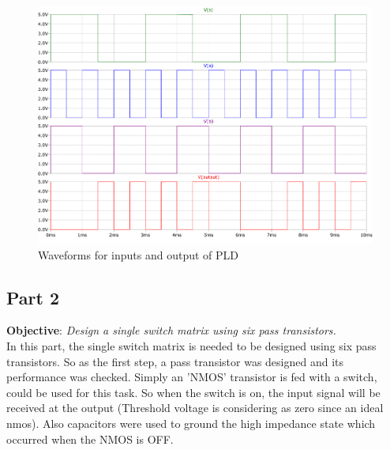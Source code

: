 \documentclass[a4paper,11pt]{article}%
\begin{document}
\begin{figure}[H]
	\centering
	\includegraphics[scale=0.5]{figures/2part1/wave.pdf}
	\caption{Waveforms for inputs and output of PLD }
\end{figure}


\subsection{Part 2}
\textbf{Objective}: \textit{Design a single switch matrix using six pass transistors.}\\

In this part, the single switch matrix is needed to be designed using six pass transistors. So as the first step, a pass transistor was designed and its performance was checked. Simply an 'NMOS' transistor is fed with a switch, could be used for this task. So when the switch is on, the input signal will be received at the output (Threshold voltage is considering as zero since an ideal nmos). Also capacitors were used to ground the high impedance state which occurred when the NMOS is OFF.
\end{document}
